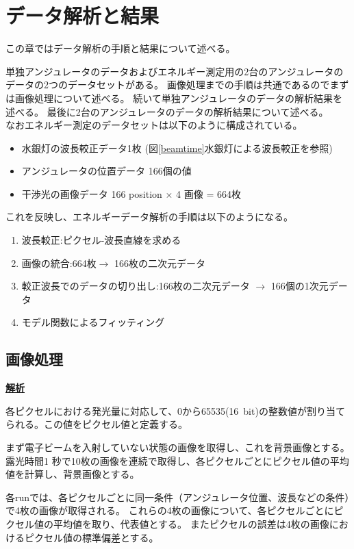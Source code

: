 \documentclass[a4paper,11pt,uplatex]{jsbook}
\begin{document}
\chapter{データ解析と結果}
この章ではデータ解析の手順と結果について述べる。

単独アンジュレータのデータおよびエネルギー測定用の2台のアンジュレータのデータの2つのデータセットがある。
画像処理までの手順は共通であるのでまずは画像処理について述べる。
続いて単独アンジュレータのデータの解析結果を述べる。
最後に2台のアンジュレータのデータの解析結果について述べる。\\
なおエネルギー測定のデータセットは以下のように構成されている。
\begin{itemize}
  \item 水銀灯の波長較正データ1枚 (図\ref{beamtime}水銀灯による波長較正を参照)
  \item アンジュレータの位置データ 166個の値
  \item 干渉光の画像データ 166 position $\times$ 4 画像 = 664枚
\end{itemize}
これを反映し、エネルギーデータ解析の手順は以下のようになる。
\begin{enumerate}
  \item 波長較正:ピクセル-波長直線を求める
  \item 画像の統合:664枚$\rightarrow$ 166枚の二次元データ
  \item 較正波長でのデータの切り出し:166枚の二次元データ $\rightarrow$ 166個の1次元データ
  \item モデル関数によるフィッティング
\end{enumerate}

\section{画像処理}
\noindent \textbf{\underline{解析}}\par
各ピクセルにおける発光量に対応して、0から65535(16~bit)の整数値が割り当てられる。この値をピクセル値と定義する。

まず電子ビームを入射していない状態の画像を取得し、これを背景画像とする。露光時間1 秒で10枚の画像を連続で取得し、各ピクセルごとにピクセル値の平均値を計算し、背景画像とする。

各runでは、各ピクセルごとに同一条件（アンジュレータ位置、波長などの条件）で4枚の画像が取得される。
これらの4枚の画像について、各ピクセルごとにピクセル値の平均値を取り、代表値とする。
またピクセルの誤差は4枚の画像におけるピクセル値の標準偏差とする。
\end{document}
